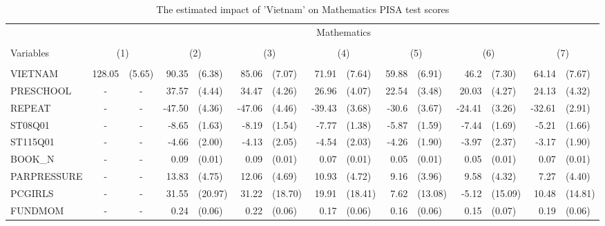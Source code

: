 \documentclass[10pt]{article}
\begin{document}
	
	\begin{table}[htbp]
		\footnotesize
		\def\arraystretch{1}
		\def\tabcolsep{4}
		\centering
		\caption{The estimated impact of 'Vietnam' on Mathematics PISA test scores}
    \begin{tabular}{lrlrlrlrlrlrlrl}
    \toprule
    \midrule
          & \multicolumn{14}{c}{Mathematics} \\
          \cline{2-15} \\
    Variables & \multicolumn{2}{c}{(1)} & \multicolumn{2}{c}{(2)} & \multicolumn{2}{c}{(3)} & \multicolumn{2}{c}{(4)} & \multicolumn{2}{c}{(5)} & \multicolumn{2}{c}{(6)} & \multicolumn{2}{c}{(7)} \\
	\hline\\
VIETNAM & 128.05 & (5.65) & 90.35 & (6.38) & 85.06 & (7.07) & 71.91 & (7.64) & 59.88 & (6.91) & 46.2  & (7.30) & 64.14 & (7.67) \\[0.2em]
PRESCHOOL & \multicolumn{1}{c}{-} & \multicolumn{1}{c}{-} & 37.57 & (4.44) & 34.47 & (4.26) & 26.96 & (4.07) & 22.54 & (3.48) & 20.03 & (4.27) & 24.13 & (4.32) \\[0.2em]
REPEAT & \multicolumn{1}{c}{-} & \multicolumn{1}{c}{-} & -47.50 & (4.36) & -47.06 & (4.46) & -39.43 & (3.68) & -30.6 & (3.67) & -24.41 & (3.26) & -32.61 & (2.91) \\[0.2em]
ST08Q01 & \multicolumn{1}{c}{-} & \multicolumn{1}{c}{-} & -8.65 & (1.63) & -8.19 & (1.54) & -7.77 & (1.38) & -5.87 & (1.59) & -7.44 & (1.69) & -5.21 & (1.66) \\[0.2em]
ST115Q01 & \multicolumn{1}{c}{-} & \multicolumn{1}{c}{-} & -4.66 & (2.00) & -4.13 & (2.05) & -4.54 & (2.03) & -4.26 & (1.90) & -3.97 & (2.37) & -3.17 & (1.90) \\[0.2em]
BOOK\_N & \multicolumn{1}{c}{-} & \multicolumn{1}{c}{-} & 0.09  & (0.01) & 0.09  & (0.01) & 0.07  & (0.01) & 0.05  & (0.01) & 0.05  & (0.01) & 0.07  & (0.01) \\[0.2em]
PARPRESSURE & \multicolumn{1}{c}{-} & \multicolumn{1}{c}{-} & 13.83 & (4.75) & 12.06 & (4.69) & 10.93 & (4.72) & 9.16  & (3.96) & 9.58  & (4.32) & 7.27  & (4.40) \\[0.2em]
PCGIRLS & \multicolumn{1}{c}{-} & \multicolumn{1}{c}{-} & 31.55 & (20.97) & 31.22 & (18.70) & 19.91 & (18.41) & 7.62  & (13.08) & -5.12 & (15.09) & 10.48 & (14.81) \\[0.2em]
FUNDMOM & \multicolumn{1}{c}{-} & \multicolumn{1}{c}{-} & 0.24  & (0.06) & 0.22  & (0.06) & 0.17  & (0.06) & 0.16  & (0.06) & 0.15  & (0.07) & 0.19  & (0.06) \\[0.2em]

\end{tabular}
\end{table}
\end{document}
